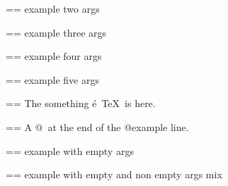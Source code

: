\documentclass{book}
\makeatletter
\newenvironment{Texinfopreformatted}{%
  \par\GNUTobeylines\obeyspaces\frenchspacing\parskip=\z@\parindent=\z@}{}
{\catcode`\^^M=13 \gdef\GNUTobeylines{\catcode`\^^M=13 \def^^M{\null\par}}}
\newenvironment{Texinfoindented}{\begin{list}{}{}\item\relax}{\end{list}}
\renewcommand{\_}{\Texinfounderscore\discretionary{}{}{}}
\makeatother
\begin{document}
\begin{Texinfoindented}
\begin{Texinfopreformatted}%
\ttfamily example two args
\end{Texinfopreformatted}
\end{Texinfoindented}

\begin{Texinfoindented}
\begin{Texinfopreformatted}%
\ttfamily example three args
\end{Texinfopreformatted}
\end{Texinfoindented}

\begin{Texinfoindented}
\begin{Texinfopreformatted}%
\ttfamily example four args
\end{Texinfopreformatted}
\end{Texinfoindented}

\begin{Texinfoindented}
\begin{Texinfopreformatted}%
\ttfamily example five args
\end{Texinfopreformatted}
\end{Texinfoindented}

\begin{Texinfoindented}
\begin{Texinfopreformatted}%
\ttfamily The something \'{e}\ \TeX{}\ is here.
\end{Texinfopreformatted}
\end{Texinfoindented}

\begin{Texinfoindented}
\begin{Texinfopreformatted}%
\ttfamily A @\ at the end of the @example line.
\end{Texinfopreformatted}
\end{Texinfoindented}

\begin{Texinfoindented}
\begin{Texinfopreformatted}%
\ttfamily example with empty args
\end{Texinfopreformatted}
\end{Texinfoindented}

\begin{Texinfoindented}
\begin{Texinfopreformatted}%
\ttfamily example with empty and non empty args mix
\end{Texinfopreformatted}
\end{Texinfoindented}
\end{document}
